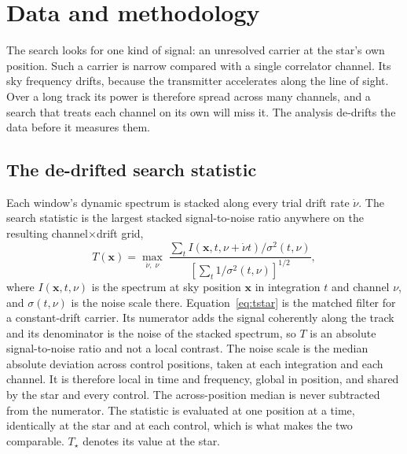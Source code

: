 \section{Data and methodology}
\label{sec:method}

The search looks for one kind of signal: an unresolved carrier at the
star's own position. Such a carrier is narrow compared with a single
correlator channel. Its sky frequency drifts, because the transmitter
accelerates along the line of sight. Over a long track its power is
therefore spread across many channels, and a search that treats each
channel on its own will miss it. The analysis de-drifts the data before
it measures them.

\subsection{The de-drifted search statistic}
\label{sec:statistic}

Each window's dynamic spectrum is stacked along every trial drift rate
$\dot\nu$. The search statistic is the largest stacked signal-to-noise
ratio anywhere on the resulting channel$\times$drift grid,
%
\begin{equation}
T(\mathbf{x})=\max_{\dot\nu,\;\nu}\;
\frac{\sum_{t} I\!\left(\mathbf{x},t,\nu+\dot\nu t\right)\big/\sigma^{2}(t,\nu)}
     {\left[\sum_{t}1\big/\sigma^{2}(t,\nu)\right]^{1/2}},
\label{eq:tstar}
\end{equation}
%
where $I(\mathbf{x},t,\nu)$ is the spectrum at sky position $\mathbf{x}$
in integration $t$ and channel $\nu$, and $\sigma(t,\nu)$ is the noise
scale there. Equation~\ref{eq:tstar} is the matched filter for a
constant-drift carrier. Its numerator adds the signal coherently along
the track and its denominator is the noise of the stacked spectrum, so
$T$ is an absolute signal-to-noise ratio and not a local contrast. The
noise scale is the median absolute deviation across \NCtrl{} control
positions, taken at each integration and each channel. It is therefore
local in time and frequency, global in position, and shared by the star
and every control. The across-position median is never subtracted from
the numerator. The statistic is evaluated at one position at a time,
identically at the star and at each control, which is what makes the two
comparable. $T_\star$ denotes its value at the star.

